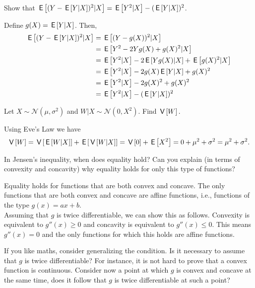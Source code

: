 \documentclass[assignments]{subfiles}
\begin{document}
\begin{exercise}
Show that $\,\mathsf{E}\left[(Y - \,\mathsf{E}\left[Y |X\right])^2|X\right] = \,\mathsf{E}\left[Y^2|X\right] - (\,\mathsf{E}\left[Y |X\right])^2$.

\begin{solution}
Define $g(X) = \,\mathsf{E}\left[Y|X\right]$. Then,
\begin{align}
    \,\mathsf{E}\left[(Y - \,\mathsf{E}\left[Y |X\right])^2|X\right]&= \,\mathsf{E}\left[(Y - g(X))^2|X\right]\\
    &=\,\mathsf{E}\left[Y^2-2Yg(X)+g(X)^2|X\right]\\
    &=\,\mathsf{E}\left[Y^2|X\right]-2\,\mathsf{E}\left[Yg(X)|X\right]+\,\mathsf{E}\left[g(X)^2|X\right]\\
    &=\,\mathsf{E}\left[Y^2|X\right]-2g(X)\,\mathsf{E}\left[Y|X\right]+g(X)^2\\
    &=\,\mathsf{E}\left[Y^2|X\right]-2g(X)^2+g(X)^2\\
    &=\,\mathsf{E}\left[Y^2|X\right]-(\,\mathsf{E}\left[Y |X\right])^2
\end{align}
\end{solution}
\end{exercise}


\begin{exercise}
Let $X\sim \mathcal{N}(\mu,\sigma^2)$ and $W|X \sim \mathcal{N}(0,X^2)$. Find $\,\mathsf{V}\left[W\right].$

\begin{solution}
Using Eve's Law we have
\begin{align}
    \,\mathsf{V}\left[W\right] = \,\mathsf{V}\left[\,\mathsf{E}\left[W|X\right]\right]+\,\mathsf{E}\left[\,\mathsf{V}\left[W|X\right]\right] =\,\mathsf{V}\left[0\right] + \,\mathsf{E}\left[X^2\right] = 0+  \mu^2 + \sigma^2 = \mu^2 + \sigma^2.
\end{align}

\end{solution}
\end{exercise}





\begin{exercise}
In Jensen's inequality, when does equality hold? Can you explain (in terms of convexity and concavity) why equality holds for only this type of functions?

\begin{solution}
Equality holds for functions that are both convex and concave. The only functions that are both convex and concave are affine functions, i.e., functions of the type $g(x)=a x+b$.\\
Assuming that $g$ is twice differentiable, we can show this as follows. Convexity is  equivalent to $g''(x)\geq 0$ and concavity is equivalent to $g''(x)\leq 0$. This means $g''(x)=0$ and the only functions for which this holds are affine functions.

If you like maths, consider generalizing the condition.
Is it necessary to assume that $g$ is twice differentiable?
For instance, it is not hard to prove that a convex function is continuous.
Consider now a point at which $g$ is convex and concave at the same time, does it follow that $g$ is twice differentiable at such a point?
\end{solution}
\end{exercise}
\end{document}

